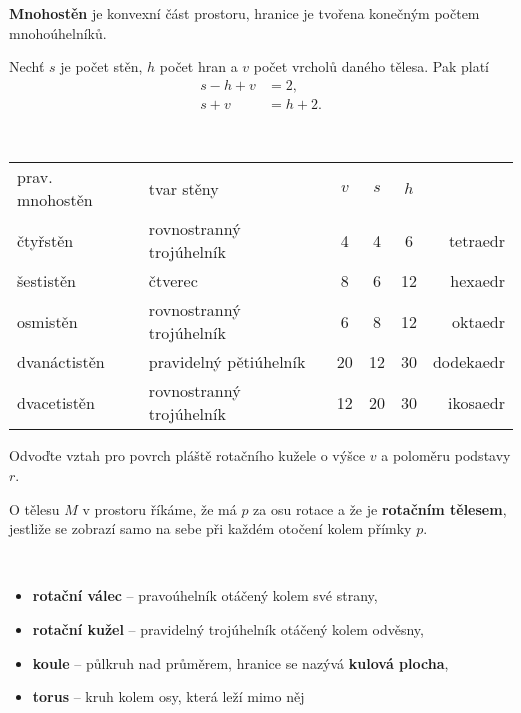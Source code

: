\begin{definition}
\textbf{Mnohostěn} je konvexní část prostoru, hranice je tvořena konečným počtem
mnohoúhelníků.
\end{definition}

\begin{veta}
    Nechť $s$ je počet stěn, $h$ počet hran a $v$ počet vrcholů daného tělesa. Pak
    platí
    \begin{align*}
        s-h+v &=2,\\
        s+v &=h+2.
    \end{align*}
\end{veta}

\begin{pozn}\,
\begin{center}
\begin{tabular}{l|l|c|c|c|r}
    prav. mnohostěn & tvar stěny & $v$ & $s$ & $h$ & \, \\
    čtyřstěn        & rovnostranný trojúhelník & 4 & 4&6 & tetraedr \\
    šestistěn       & čtverec & 8 & 6&12 & hexaedr \\
    osmistěn        & rovnostranný trojúhelník & 6 & 8&12 & oktaedr \\
    dvanáctistěn    & pravidelný pětiúhelník & 20 & 12&30 & dodekaedr \\
    dvacetistěn     & rovnostranný trojúhelník & 12 & 20&30 & ikosaedr \\
\end{tabular}
\end{center}

\end{pozn}

\begin{priklad}
Odvoďte vztah pro povrch pláště rotačního kužele o výšce $v$ a poloměru
podstavy $r$.
\end{priklad}

\begin{definition}
    O tělesu $M$ v prostoru říkáme, že má $p$ za osu rotace a že je \textbf{rotačním
    tělesem}, jestliže se zobrazí samo na sebe při každém otočení kolem přímky $p.$
\end{definition}

\begin{pozn}\,
\begin{itemize}
\item \textbf{rotační válec} -- pravoúhelník otáčený kolem své strany,
\item \textbf{rotační kužel} -- pravidelný trojúhelník otáčený kolem odvěsny,
\item \textbf{koule} -- půlkruh nad průměrem, hranice se nazývá \textbf{kulová plocha},
\item \textbf{torus} -- kruh kolem osy, která leží mimo něj
\end{itemize}
\end{pozn}

